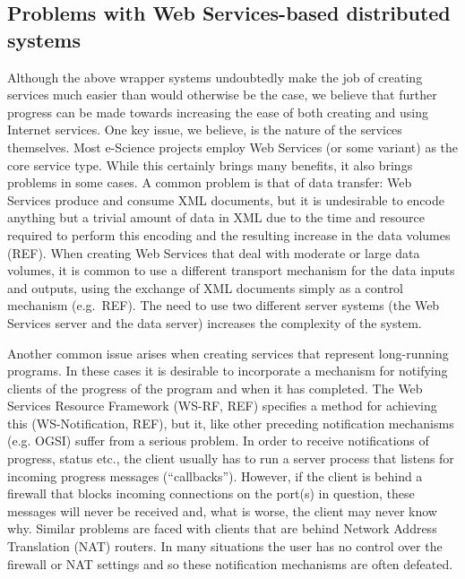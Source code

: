 \documentclass{llncs}
\begin{document}
\subsection{Problems with Web Services-based distributed systems}
Although the above wrapper systems undoubtedly make the job of creating services much easier than would otherwise be the case, we believe that further progress can be made towards increasing the ease of both creating and using Internet services.  One key issue, we believe, is the nature of the services themselves.  Most e-Science projects employ Web Services (or some variant) as the core service type.  While this certainly brings many benefits, it also brings problems in some cases.  A common problem is that of data transfer: Web Services produce and consume XML documents, but it is undesirable to encode anything but a trivial amount of data in XML due to the time and resource required to perform this encoding and the resulting increase in the data volumes (REF).  When creating Web Services that deal with moderate or large data volumes, it is common to use a different transport mechanism for the data inputs and outputs, using the exchange of XML documents simply as a control mechanism (e.g.\ REF).  The need to use two different server systems (the Web Services server and the data server) increases the complexity of the system.

Another common issue arises when creating services that represent long-running programs.  In these cases it is desirable to incorporate a mechanism for notifying clients of the progress of the program and when it has completed.  The Web Services Resource Framework (WS-RF, REF) specifies a method for achieving this (WS-Notification, REF), but it, like other preceding notification mechanisms (e.g. OGSI) suffer from a serious problem.  In order to receive notifications of progress, status etc., the client usually has to run a server process that listens for incoming progress messages (``callbacks'').  However, if the client is behind a firewall that blocks incoming connections on the port(s) in question, these messages will never be received and, what is worse, the client may never know why.  Similar problems are faced with clients that are behind Network Address Translation (NAT) routers.  In many situations the user has no control over the firewall or NAT settings and so these notification mechanisms are often defeated.
\end{document}
